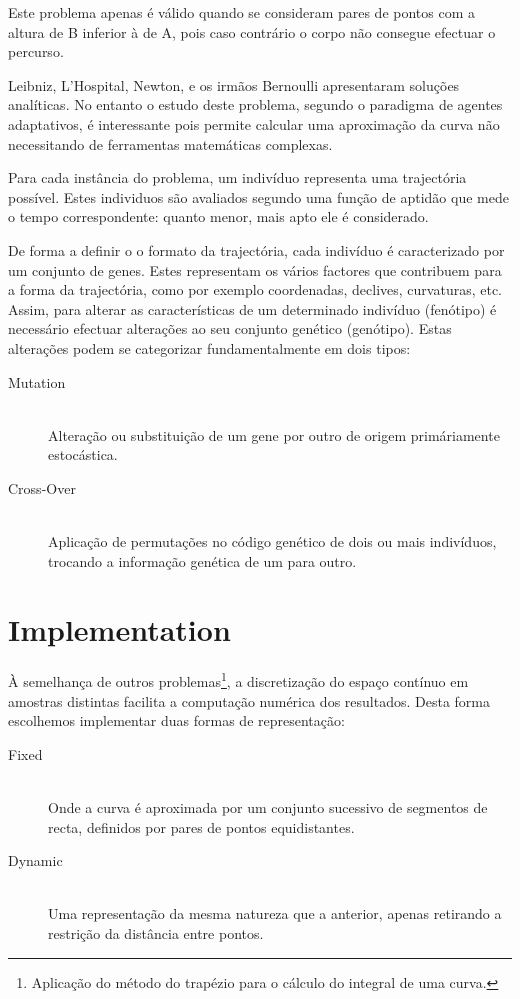 \documentclass[a4paper]{article}
\begin{document}
\indent Este problema apenas é válido quando se consideram pares de pontos com a altura de B inferior à de A, pois caso contrário o corpo não consegue efectuar o percurso.

Leibniz, L'Hospital, Newton, e os irmãos Bernoulli apresentaram soluções analíticas.
No entanto o estudo deste problema, segundo o paradigma de agentes adaptativos, é interessante pois permite calcular uma aproximação da curva
não necessitando de ferramentas matemáticas complexas.

\indent Para cada instância do problema, um indivíduo representa uma trajectória possível. Estes individuos são avaliados segundo uma
função de aptidão que mede o tempo correspondente: quanto menor, mais apto ele é considerado.

\indent De forma a definir o o formato da trajectória, cada indivíduo é caracterizado por um conjunto de genes. Estes representam os vários
factores que contribuem para a forma da trajectória, como por exemplo coordenadas, declives, curvaturas, etc. Assim, para alterar as características
de um determinado indivíduo (fenótipo) é necessário efectuar alterações ao seu conjunto genético (genótipo). Estas alterações podem se categorizar
fundamentalmente em dois tipos:

\begin{description}
	\item[Mutation] \hfill \\ 
		Alteração ou substituição de um gene por outro de origem primáriamente estocástica.
	\item[Cross-Over] \hfill \\ 
		Aplicação de permutações no código genético de dois ou mais indivíduos, trocando a informação genética de um para outro.
\end{description}

\cleardoublepage
\section{Implementation}
\indent \indent À semelhança de outros problemas\footnote[1]{Aplicação do método do trapézio para o cálculo do integral de uma curva.}, a discretização do espaço contínuo em amostras
distintas facilita a computação numérica dos resultados. Desta forma escolhemos implementar duas formas de representação:

\begin{description}
	\item[Fixed] \hfill \\ 
		Onde a curva é aproximada por um conjunto sucessivo de segmentos de recta, definidos por pares de pontos equidistantes.
	\item[Dynamic] \hfill \\ 
		Uma representação da mesma natureza que a anterior, apenas retirando a restrição da distância entre pontos.
\end{description}
\end{document}
